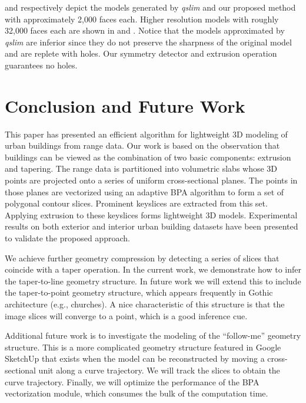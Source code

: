  and  respectively depict the models generated
by {\it qslim} and our proposed method with approximately 2,000 faces each.
Higher resolution models with roughly 32,000 faces each are shown in
 and .
Notice that the models approximated by {\it qslim} are inferior since they
do not preserve the sharpness of the original model and are replete with
holes. Our symmetry detector and extrusion operation guarantees no holes.



\section{Conclusion and Future Work}

This paper has presented an efficient algorithm for lightweight 3D modeling
of urban buildings from range data.
Our work is based on the observation that buildings can be viewed as the
combination of two basic components: extrusion and tapering.
The range data is partitioned into volumetric slabs whose 3D points are
projected onto a series of uniform cross-sectional planes.
The points in those planes are vectorized using an adaptive BPA algorithm
to form a set of polygonal contour slices.
Prominent keyslices are extracted from this set.
Applying extrusion to these keyslices forms lightweight 3D models.
Experimental results on both exterior and interior urban building datasets
have been presented to validate the proposed approach.

We achieve further geometry compression by detecting a series of
slices that coincide with a taper operation.
In the current work, we demonstrate how to infer the taper-to-line
geometry structure.
In future work we will extend this to include the taper-to-point geometry
structure, which appears frequently in Gothic architecture (e.g., churches).
A nice characteristic of this structure is that the image slices will converge
to a point, which is a good inference cue.

Additional future work is to investigate the modeling of the ``follow-me''
geometry structure.
This is a more complicated geometry structure featured in Google SketchUp
that exists when the model can be reconstructed by moving a cross-sectional
unit along a curve trajectory.
We will track the slices to obtain the curve trajectory.
Finally, we will optimize the performance of the BPA vectorization module,
which consumes the bulk of the computation time.

